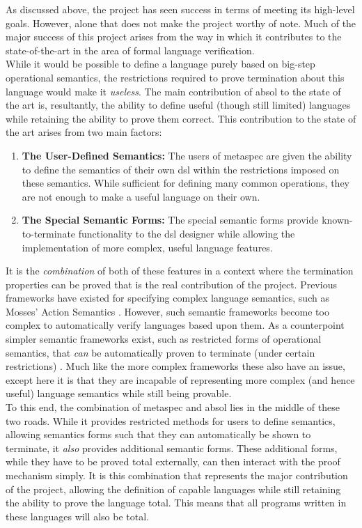 As discussed above, the project has seen success in terms of meeting its high-level goals.
However, alone that does not make the project worthy of note.
Much of the major success of this project arises from the way in which it contributes to the state-of-the-art in the area of formal language verification.\\

While it would be possible to define a language purely based on big-step operational semantics, the restrictions required to prove termination about this language would make it \textit{useless}.
The main contribution of \gls{absol} to the state of the art is, resultantly, the ability to define useful (though still limited) languages while retaining the ability to prove them correct.
This contribution to the state of the art arises from two main factors:
\begin{enumerate}
    \item \textbf{The User-Defined Semantics:} The users of \gls{metaspec} are given the ability to define the semantics of their own \gls{dsl} within the restrictions imposed on these semantics.
    While sufficient for defining many common operations, they are not enough to make a useful language on their own.
    \item \textbf{The Special Semantic Forms:} The special semantic forms provide known-to-terminate functionality to the \gls{dsl} designer while allowing the implementation of more complex, useful language features.
\end{enumerate}

It is the \textit{combination} of both of these features in a context where the termination properties can be proved that is the real contribution of the project.
Previous frameworks have existed for specifying complex language semantics, such as Mosses' Action Semantics \citep{mosses1992action}. 
However, such semantic frameworks become too complex to automatically verify languages based upon them.
As a counterpoint simpler semantic frameworks exist, such as restricted forms of operational semantics, that \textit{can} be automatically proven to terminate (under certain restrictions) \citep{Zhang:2004:SSD:981009.981013}.
Much like the more complex frameworks these also have an issue, except here it is that they are incapable of representing more complex (and hence useful) language semantics while still being provable.\\

To this end, the combination of \gls{metaspec} and \gls{absol} lies in the middle of these two roads.
While it provides restricted methods for users to define semantics, allowing semantics forms such that they can automatically be shown to terminate,
it \textit{also} provides additional semantic forms.
These additional forms, while they have to be proved total externally, can then interact with the proof mechanism simply. 
It is this combination that represents the major contribution of the project, allowing the definition of capable languages while still retaining the ability to prove the language total.
This means that all programs written in these languages will also be total.\\


